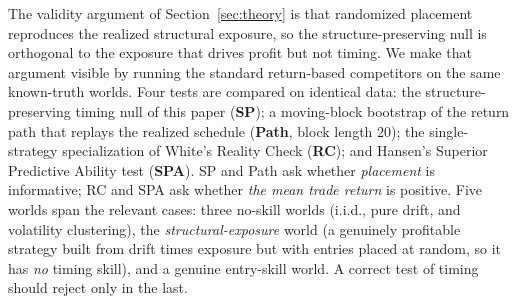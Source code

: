 \documentclass[preprint,12pt]{elsarticle}
\theoremstyle{definition}
\begin{document}
The validity argument of Section~\ref{sec:theory} is that randomized placement reproduces the realized structural exposure, so the structure-preserving null is orthogonal to the exposure that drives profit but not timing. We make that argument visible by running the standard return-based competitors on the same known-truth worlds. Four tests are compared on identical data: the structure-preserving timing null of this paper (\textbf{SP}); a moving-block bootstrap of the return path that replays the realized schedule (\textbf{Path}, block length $20$); the single-strategy specialization of White's Reality Check \cite{white2000} (\textbf{RC}); and Hansen's Superior Predictive Ability test \cite{hansen2005} (\textbf{SPA}). SP and Path ask whether \emph{placement} is informative; RC and SPA ask whether \emph{the mean trade return} is positive. Five worlds span the relevant cases: three no-skill worlds (i.i.d., pure drift, and volatility clustering), the \emph{structural-exposure} world (a genuinely profitable strategy built from drift times exposure but with entries placed at random, so it has \emph{no} timing skill), and a genuine entry-skill world. A correct test of timing should reject only in the last.
\end{document}
